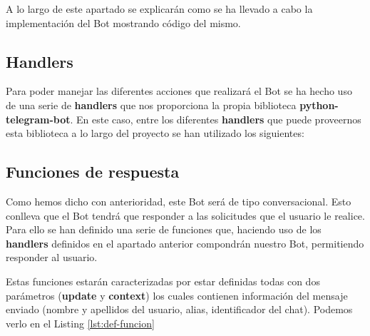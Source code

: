 A lo largo de este apartado se explicarán como se ha llevado a cabo la implementación del Bot mostrando código del mismo.

\subsection{Handlers}

Para poder manejar las diferentes acciones que realizará el Bot se ha hecho uso de una serie de \textbf{handlers} que nos proporciona la propia biblioteca \textbf{python-telegram-bot}. En este caso, entre los diferentes \textbf{handlers} que puede proveernos esta biblioteca a lo largo del proyecto se han utilizado los siguientes:


\subsection{Funciones de respuesta}

Como hemos dicho con anterioridad, este Bot será de tipo conversacional. Esto conlleva que el Bot tendrá que responder a las solicitudes que el usuario le realice. Para ello se han definido una serie de funciones que, haciendo uso de los \textbf{handlers} definidos en el apartado anterior compondrán nuestro Bot, permitiendo responder al usuario.

Estas funciones estarán caracterizadas por estar definidas todas con dos parámetros (\textbf{update} y \textbf{context}) los cuales contienen información del mensaje enviado (nombre y apellidos del usuario, alias, identificador del chat). Podemos verlo en el Listing \ref{lst:def-funcion}

